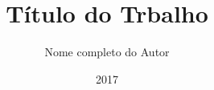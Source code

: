 \documentclass[pt,oneside,onehalfspacing,acd]{ifbclass/ifbclass}
\title{Título do Trbalho }
\date{2017}
\author{Nome completo do Autor}
\begin{document}
  
  \frontmatter
  
  \frontpage
  
  
  \resumo
  {\parindent0pt
    
  }
  \tableofcontents
  
  \mainmatter
  
  
  
  
  \begin{references}
    
  \end{references}
  
  
\end{document}
